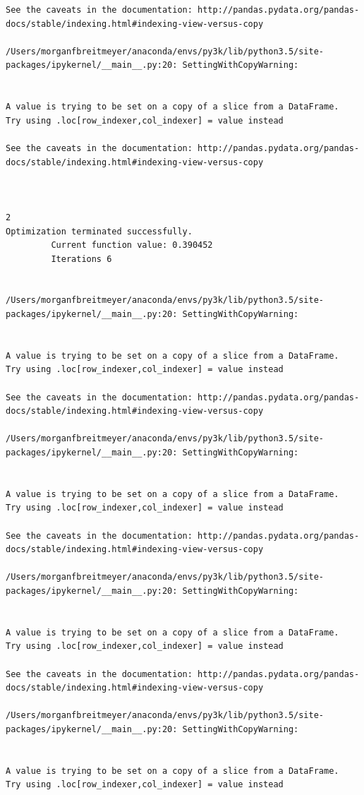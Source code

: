 \begin{lstlisting}
See the caveats in the documentation: http://pandas.pydata.org/pandas-docs/stable/indexing.html#indexing-view-versus-copy

/Users/morganfbreitmeyer/anaconda/envs/py3k/lib/python3.5/site-packages/ipykernel/__main__.py:20: SettingWithCopyWarning:


A value is trying to be set on a copy of a slice from a DataFrame.
Try using .loc[row_indexer,col_indexer] = value instead

See the caveats in the documentation: http://pandas.pydata.org/pandas-docs/stable/indexing.html#indexing-view-versus-copy



2
Optimization terminated successfully.
         Current function value: 0.390452
         Iterations 6


/Users/morganfbreitmeyer/anaconda/envs/py3k/lib/python3.5/site-packages/ipykernel/__main__.py:20: SettingWithCopyWarning:


A value is trying to be set on a copy of a slice from a DataFrame.
Try using .loc[row_indexer,col_indexer] = value instead

See the caveats in the documentation: http://pandas.pydata.org/pandas-docs/stable/indexing.html#indexing-view-versus-copy

/Users/morganfbreitmeyer/anaconda/envs/py3k/lib/python3.5/site-packages/ipykernel/__main__.py:20: SettingWithCopyWarning:


A value is trying to be set on a copy of a slice from a DataFrame.
Try using .loc[row_indexer,col_indexer] = value instead

See the caveats in the documentation: http://pandas.pydata.org/pandas-docs/stable/indexing.html#indexing-view-versus-copy

/Users/morganfbreitmeyer/anaconda/envs/py3k/lib/python3.5/site-packages/ipykernel/__main__.py:20: SettingWithCopyWarning:


A value is trying to be set on a copy of a slice from a DataFrame.
Try using .loc[row_indexer,col_indexer] = value instead

See the caveats in the documentation: http://pandas.pydata.org/pandas-docs/stable/indexing.html#indexing-view-versus-copy

/Users/morganfbreitmeyer/anaconda/envs/py3k/lib/python3.5/site-packages/ipykernel/__main__.py:20: SettingWithCopyWarning:


A value is trying to be set on a copy of a slice from a DataFrame.
Try using .loc[row_indexer,col_indexer] = value instead


\end{lstlisting}
